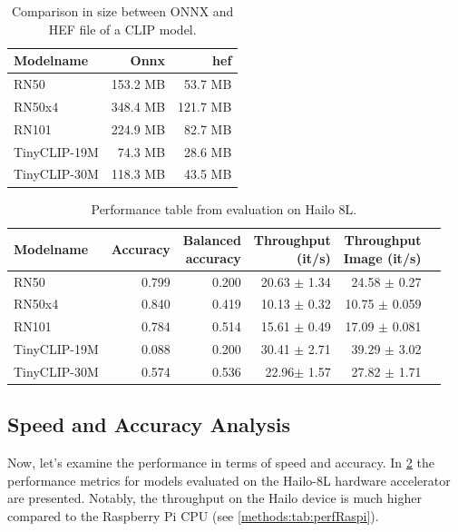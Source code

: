 \begin{table}
    \centering
    \begin{tabular}{l|rr}
    \hline
    Modelname & Onnx & \acrshort{hef}\\\hline
    RN50 & 153.2 MB & 53.7 MB \\ 
    RN50x4 & 348.4 MB & 121.7 MB  \\ 
    RN101 & 224.9 MB  & 82.7 MB \\
    TinyCLIP-19M & 74.3 MB & 28.6 MB  \\ 
    TinyCLIP-30M & 118.3 MB & 43.5 MB  \\ 
    \end{tabular}
    \caption{Comparison in size between ONNX and HEF file of a CLIP model.}
    \label{methods:tab:sizecompare}
\end{table}

\begin{table}[]
    \centering
    \begin{tabular}{l|rrrrr}
    \hline
    Modelname & Accuracy &  \makecell{Balanced \\accuracy}&\makecell{Throughput\\(it/s)} & \makecell{Throughput \\ Image (it/s)} & \\ \hline
    RN50 & 0.799 & 0.200 & 20.63 $\pm$ 1.34 & 24.58 $\pm$ 0.27  \\ 
    RN50x4 & 0.840 & 0.419 & 10.13 $\pm$ 0.32 & 10.75  $\pm$ 0.059\\
    RN101 & 0.784& 0.514 & 15.61 $\pm$ 0.49 & 17.09 $\pm$ 0.081\\  
    TinyCLIP-19M & 0.088 & 0.200 & 30.41 $\pm$ 2.71 & 39.29 $\pm$ 3.02 \\ 
    TinyCLIP-30M & 0.574 & 0.536 & 22.96$\pm$ 1.57 & 27.82 $\pm$ 1.71\\ 
    \end{tabular}
    \caption{Performance table from evaluation on Hailo 8L.}
    \label{methods:tab:perfHailo}
\end{table}

\subsection{Speed and Accuracy Analysis}

Now, let's examine the performance in terms of speed and accuracy.
In \cref{methods:tab:perfHailo} the performance metrics for models evaluated on the Hailo-8L hardware accelerator are presented.
Notably, the throughput on the Hailo device is much higher compared to the Raspberry Pi CPU (see \cref{methods:tab:perfRaspi}).

